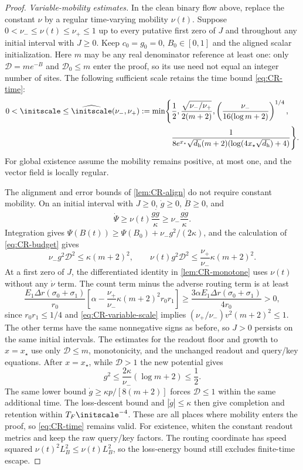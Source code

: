 \begin{proof}
\emph{Variable-mobility estimates.}
In the clean binary flow above, replace the constant $\nu$ by a regular time-varying mobility $\nu(t)$.
Suppose $0<\nu_-\le\nu(t)\le\nu_+\le1$ up to every putative first zero of $J$ and throughout any initial interval with $J\ge0$.
Keep $c_0=g_0=0$, $B_0\in[0,1]$ and the aligned scalar initialization.
Here $m$ may be any real denominator reference at least one: only $\mathcal D=me^{-B}$ and $\mathcal D_0\le m$ enter the proof,
so its use need not equal an integer number of sites.
The following sufficient scale retains the time bound \cref{eq:CR-time}:
\begin{equation}
 \begin{aligned}
 0<\initscale\le\widehat\initscale(\nu_-,\nu_+):=\min\Biggl\{&\frac12,
 \frac{\sqrt{\nu_-/\nu_+}}{2(m+2)},
 \left(\frac{\nu_-}{16(\log m+2)}\right)^{1/4},\\
 &\frac1{8e^{x_\star}\sqrt{d_{\mathrm h}}(m+2)(\log(4x_\star\sqrt{d_{\mathrm h}})+4)}\Biggr\}.
 \end{aligned}
 \label{eq:CR-variable-scale}
\end{equation}
For global existence assume the mobility remains positive, at most one, and the vector field is locally regular.


The alignment and error bounds of \cref{lem:CR-align} do not require constant mobility.
On an initial interval with $J\ge0$, $\dot g\ge0$, $\dot B\ge0$, and
\[
 \dot \Psi\ge\nu(t)\frac{g\dot g}{\kappa}\ge\nu_-\frac{g\dot g}{\kappa}.
\]
Integration gives $\Psi(B(t))\ge \Psi(B_0)+\nu_-g^2/(2\kappa)$, and the calculation of \cref{eq:CR-budget} gives
\begin{equation}
 \nu_-g^2\mathcal D^2\le\kappa(m+2)^2,\qquad
 \nu(t)g^2\mathcal D^2\le\frac{\nu_+}{\nu_-}\kappa(m+2)^2.
 \label{eq:CR-variable-budget}
\end{equation}
At a first zero of $J$, the differentiated identity in \cref{lem:CR-monotone} uses $\nu(t)$ without any $\dot\nu$ term.
The count term minus the adverse routing term is at least
\[
 \frac{E_1\Delta r(\sigma_0+\sigma_1)}{r_0}
 \left[\alpha-\frac{\nu_+}{\nu_-}\kappa(m+2)^2r_0r_1\right]
 \ge\frac{3\alpha E_1\Delta r(\sigma_0+\sigma_1)}{4r_0}>0,
\]
since $r_0r_1\le1/4$ and \cref{eq:CR-variable-scale} implies
$(\nu_+/\nu_-)v^2(m+2)^2\le1$.
The other terms have the same nonnegative signs as before, so $J>0$ persists on the same initial intervals.
The estimates for the readout floor and growth to $x=x_\star$ use only $\mathcal D\le m$, monotonicity, and the unchanged readout and query/key equations.
After $x=x_\star$, while $\mathcal D>1$ the new potential gives
\[
 g^2\le\frac{2\kappa}{\nu_-}(\log m+2)\le\frac12.
\]
The same lower bound $\dot g\ge\kappa p/[8(m+2)]$ forces $\mathcal D\le1$ within the same additional time.
The loss-descent bound and $|\dot g|\le\kappa$ then give completion and retention within $T_F\initscale^{-4}$.
These are all places where mobility enters the proof, so \cref{eq:CR-time} remains valid.
For existence, whiten the constant readout metrics and keep the raw query/key factors. The routing coordinate has speed squared
$\nu(t)^2L_B^2\le\nu(t)L_B^2$, so the loss-energy bound still excludes finite-time escape.


\end{proof}
